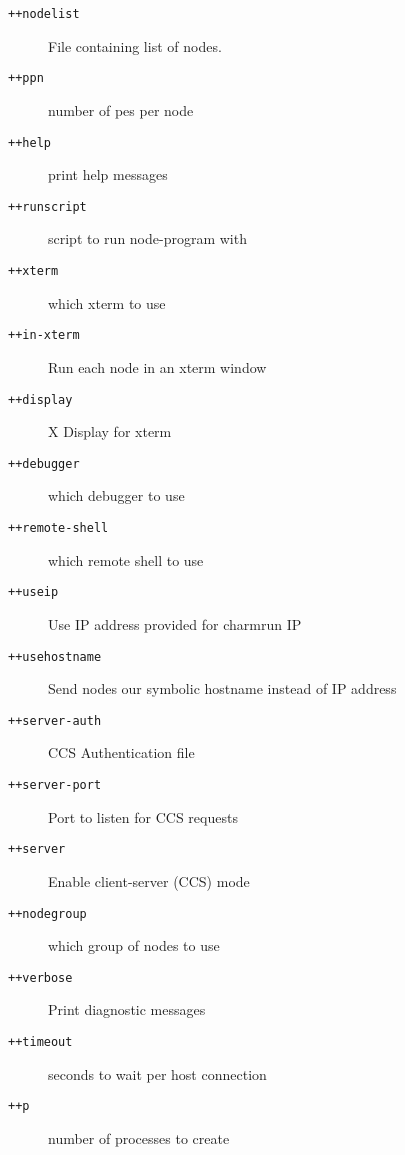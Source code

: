 \begin{description}
\item[{\tt ++nodelist}] File containing list of nodes.


\item[{\tt ++ppn}]              number of pes per node

\item[{\tt ++help}]             print help messages

\item[{\tt ++runscript}]        script to run node-program with

\item[{\tt ++xterm}]            which xterm to use

\item[{\tt ++in-xterm}]         Run each node in an xterm window

\item[{\tt ++display}]          X Display for xterm

\item[{\tt ++debugger}]         which debugger to use

\item[{\tt ++remote-shell}]     which remote shell to use

\item[{\tt ++useip}]            Use IP address provided for charmrun IP

\item[{\tt ++usehostname}]      Send nodes our symbolic hostname instead of IP address

\item[{\tt ++server-auth}]      CCS Authentication file

\item[{\tt ++server-port}]      Port to listen for CCS requests

\item[{\tt ++server}]           Enable client-server (CCS) mode

\item[{\tt ++nodegroup}]        which group of nodes to use

\item[{\tt ++verbose}]          Print diagnostic messages

\item[{\tt ++timeout}]          seconds to wait per host connection

\item[{\tt ++p}]                number of processes to create

\end{description}

